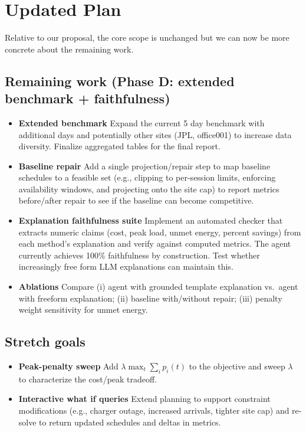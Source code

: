 \documentclass{article}
\begin{document}
\section{Updated Plan}
Relative to our proposal, the core scope is unchanged but we can now be more concrete about the remaining work.

\subsection{Remaining work (Phase D: extended benchmark + faithfulness)}
\begin{itemize}
  \item \textbf{Extended benchmark} Expand the current 5 day benchmark with additional days and potentially other sites (JPL, office001) to increase data diversity. Finalize aggregated tables for the final report.
  \item \textbf{Baseline repair} Add a single projection/repair step to map baseline schedules to a feasible set (e.g., clipping to per-session limits, enforcing availability windows, and projecting onto the site cap) to report metrics before/after repair to see if the baseline can become competitive.
  \item \textbf{Explanation faithfulness suite} Implement an automated checker that extracts numeric claims (cost, peak load, unmet energy, percent savings) from each method's explanation and verify against computed metrics. The agent currently achieves 100\% faithfulness by construction. Test whether increasingly free form LLM explanations can maintain this.
  \item \textbf{Ablations} Compare (i) agent with grounded template explanation vs.\ agent with freeform explanation; (ii) baseline with/without repair; (iii) penalty weight sensitivity for unmet energy.
\end{itemize}

\subsection{Stretch goals}
\begin{itemize}
  \item \textbf{Peak-penalty sweep} Add $\lambda \max_t \sum_i p_i(t)$ to the objective and sweep $\lambda$ to characterize the cost/peak tradeoff.
  \item \textbf{Interactive what if queries} Extend planning to support constraint modifications (e.g., charger outage, increased arrivals, tighter site cap) and re-solve to return updated schedules and deltas in metrics.
\end{itemize}
\end{document}
